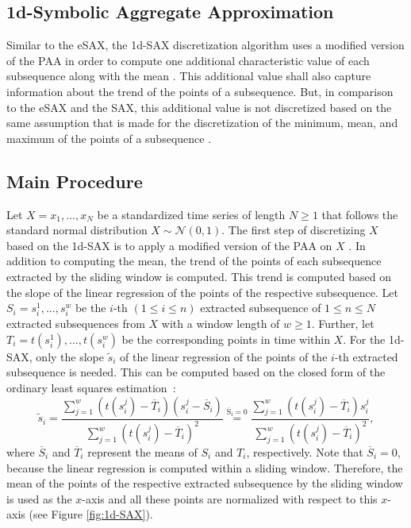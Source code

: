 \newpage
\subsection{1d-Symbolic Aggregate Approximation}
Similar to the \ac{eSAX}, the \ac{1d-SAX} discretization algorithm uses a modified version of the \ac{PAA} in order to compute one additional characteristic value of each subsequence along with the mean \cite{1d-SAX}. This additional value shall also capture information about the trend of the points of a subsequence. \newline
But, in comparison to the \ac{eSAX} and the \ac{SAX}, this additional value is not discretized based on the same assumption that is made for the discretization of the minimum, mean, and maximum of the points of a subsequence \cite{1d-SAX}.
\subsection*{Main Procedure}
Let $X = x_1, ..., x_N$ be a standardized time series of length $N \geq 1$ that follows the standard normal distribution $X \sim \mathcal{N}(0,1)$. The first step of discretizing $X$ based on the \ac{1d-SAX} is to apply a modified version of the PAA on $X$ \cite{1d-SAX}. In addition to computing the mean, the trend of the points of each subsequence extracted by the sliding window is computed. This trend is computed based on the slope of the linear regression of the points of the respective subsequence. Let  $S_i = s_{i}^1, ..., s_{i}^w$ be the $i$-th $(1 \leq i \leq n)$ extracted subsequence of $1 \leq n \leq N$ extracted subsequences from $X$ with a window length of $w \geq 1$. Further, let $T_i = t(s_{i}^1), ..., t(s_{i}^w)$ be the corresponding points in time within $X$. For the \ac{1d-SAX}, only the slope $\tilde{s}_i$ of the linear regression of the points of the $i$-th extracted subsequence is needed. This can be computed based on the closed form of the ordinary least squares \mbox{estimation \cite{1d-SAX}:}
\begin{equation}
\tilde{s}_i = \frac{\sum_{j=1}^{w}(t(s_{i}^j)-\overline{T}_i)(s_{i}^j - \overline{S}_i)}{\sum_{j=1}^{w}(t(s_{i}^j)-\overline{T}_i)^2} \stackrel{\mathrm{\overline{S}_i = 0}}{=} \frac{\sum_{j=1}^{w}(t(s_{i}^j)-\overline{T}_i)s_{i}^j}{\sum_{j=1}^{w}(t(s_{i}^j)-\overline{T}_i)^2},
\label{eq:slope}
\end{equation}
where $\overline{S}_i$ and $\overline{T}_i$ represent the means of $S_i$ and $T_i$, respectively. Note that $\overline{S}_i = 0$, because the linear regression is computed within a sliding window. Therefore, the mean of the points of the respective extracted subsequence by the sliding window is used as the $x$-axis and all these points are normalized with respect to this $x$-axis (see Figure \ref{fig:1d-SAX}). \newline
